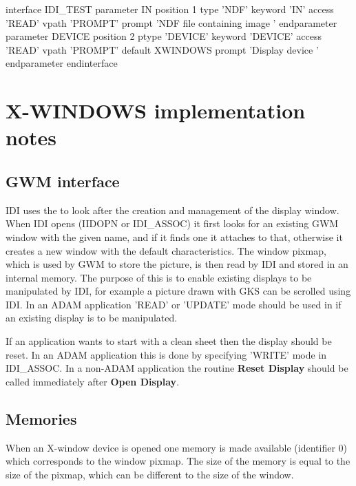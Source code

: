 \documentclass[11pt,nolof]{starlink}
\begin{document}
\newpage
\begin{small}
\begin{terminalv}
interface IDI_TEST
   parameter IN
      position 1
      type 'NDF'
      keyword 'IN'
      access 'READ'
      vpath 'PROMPT'
      prompt 'NDF file containing image '
   endparameter
   parameter DEVICE
      position 2
      ptype  'DEVICE'
      keyword 'DEVICE'
      access 'READ'
      vpath 'PROMPT'
      default XWINDOWS
      prompt 'Display device '
   endparameter
endinterface
\end{terminalv}
\end{small}

\newpage
\section{X-WINDOWS implementation notes}
\label{se:xin}

\subsection{GWM interface}

IDI uses the  to look after the creation
and management of the display window. When IDI opens (IIDOPN or IDI\_ASSOC)
it first looks for an existing GWM window with the given name, and if
it finds one it attaches to that, otherwise it creates a new window with
the default characteristics. The window pixmap, which is used by GWM to
store the picture, is then read by IDI and stored in an internal memory.
The purpose of this is to enable existing displays to be manipulated by
IDI, for example a picture drawn with GKS can be scrolled using IDI.
In an ADAM application 'READ' or 'UPDATE' mode should be used in
 if an existing display is to be manipulated.

If an application wants to start with a clean sheet then the display
should be reset. In an ADAM application this is done by specifying
'WRITE' mode in IDI\_ASSOC. In a non-ADAM application the routine
\textbf{Reset Display} should be called immediately after \textbf{Open
Display}.

\subsection{Memories}

When an X-window device is opened one memory is made available
(identifier 0) which corresponds to the window pixmap. The size of the
memory is equal to the size of the pixmap, which can be different to
the size of the window.
\end{document}
